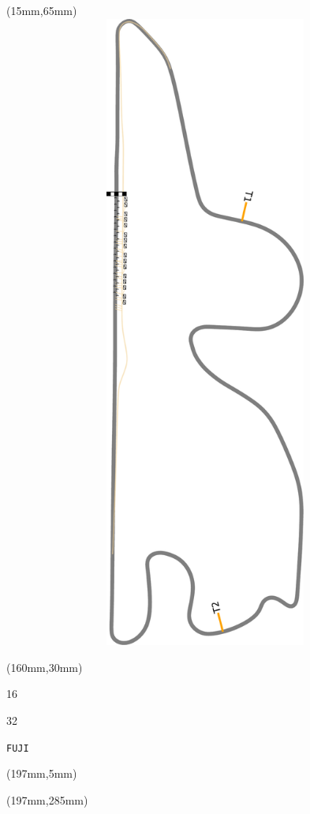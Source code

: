\begin{textblock*}{185mm}(15mm,65mm)%
\centering
\mbox{\includegraphics[width=185mm,height=210mm,keepaspectratio]{PT/FUJI.pdf}}
\end{textblock*}
\begin{textblock*}{40mm}(160mm,30mm)%
\Large
\par{} 
\par16 
\par32 
\par\hfill\tiny\tt FUJI\\
\end{textblock*}
\begin{textblock*}{20mm}(197mm,5mm)%
\fbox{\thepage}
\label{FUJI}
\end{textblock*}
\begin{textblock*}{20mm}(197mm,285mm)%
\fbox{\thepage}
\end{textblock*}

